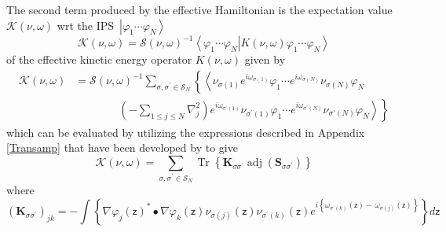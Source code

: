 \documentclass[aps,preprint]{revtex4}%
\begin{document}
The second term produced by the effective Hamiltonian is the expectation value
$\mathcal{K}\left(  \nu,\omega\right)  $ wrt the IPS\ $\left\vert \varphi
_{1}\cdots\varphi_{N}\right\rangle $
\begin{equation}
\mathcal{K}\left(  \nu,\omega\right)  =\mathcal{S}\left(  \nu,\omega\right)
^{-1}\left\langle \varphi_{1}\cdots\varphi_{N}\right\vert \left.  K\left(
\nu,\omega\right)  \varphi_{1}\cdots\varphi_{N}\right\rangle
\end{equation}
of the effective kinetic energy operator $K\left(  \nu,\omega\right)  $ given
by
\begin{align}
\mathcal{K}\left(  \nu,\omega\right)   &  =\mathcal{S}\left(  \nu
,\omega\right)  ^{-1}%
{\displaystyle\sum\limits_{\sigma,\sigma^{\prime}\in\mathcal{S}_{N}}}
\left\{  \left\langle \nu_{\sigma\left(  1\right)  }e^{i\omega_{\sigma\left(
1\right)  }}\varphi_{1}\cdots e^{i\omega_{\sigma\left(  N\right)  }}%
\nu_{\sigma\left(  N\right)  }\varphi_{N}\right.  \right. \nonumber\\
&  \qquad\qquad\left.  \left(  -%
{\displaystyle\sum\limits_{1\leq j\leq N}}
\nabla_{j}^{2}\right)  \left.  e^{i\omega_{\sigma^{\prime}\left(  1\right)  }%
}\nu_{\sigma^{\prime}\left(  1\right)  }\varphi_{1}\cdots e^{i\omega
_{\sigma^{\prime}\left(  N\right)  }}\nu_{\sigma\prime\left(  N\right)
}\varphi_{N}\right\rangle \right\}
\end{align}
which can be evaluated by utilizing the expressions described in Appendix
\ref{Transamp} that have been developed by \cite{Verbeek1990} to give
\begin{equation}
\mathcal{K}\left(  \nu,\omega\right)  =%
{\textstyle\sum\limits_{\sigma,\sigma^{\prime}\in\mathcal{S}_{N}}}
\operatorname{Tr}\left\{  \mathbf{K}_{\sigma\sigma^{\prime}}\operatorname{adj}%
\left(  \mathbf{S}_{\sigma\sigma^{\prime}}\right)  \right\}
\end{equation}
where
\begin{equation}
\left(  \mathbf{K}_{\sigma\sigma^{\prime}}\right)  _{jk}=-\int\left\{
\nabla\varphi_{j}\left(  \mathsf{z}\right)  ^{\ast}\bullet\nabla\varphi
_{k}\left(  \mathsf{z}\right)  \nu_{\sigma\left(  j\right)  }\left(
\mathsf{z}\right)  \nu_{\sigma^{\prime}\left(  k\right)  }\left(
\mathsf{z}\right)  e^{i\left\{  \omega_{\sigma^{\prime}\left(  k\right)
}\left(  \mathsf{z}\right)  -\,\omega_{\sigma\left(  j\right)  }\left(
\mathsf{z}\right)  \right\}  }\right\}  d\mathsf{z}%
\end{equation}
\end{document}

